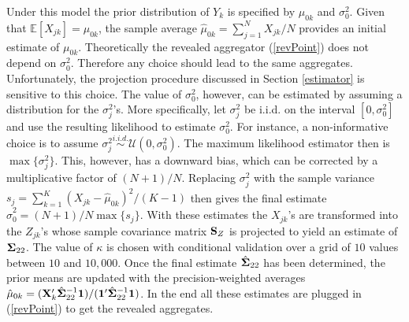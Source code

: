 \documentclass[11pt]{article}
\newcommand{\E}{\mathbb{E}}
\theoremstyle{definition}
\theoremstyle{definition}
\def\one{{\bf 1}}
\def\bSigma{{\bf \Sigma}}
\def\X{{\bf X}}
\def\SS{{\bf S}}
\def\E{{\mathbb E}}
\begin{document}
Under this model the prior distribution of $Y_k$ is specified by $\mu_{0k}$ and $\sigma_0^2$. Given that $\E[X_{jk}] = \mu_{0k}$, the sample average $\hat{\mu}_{0k} = \sum_{j=1}^N X_{jk}/N$ provides an initial estimate of $\mu_{0k}$. Theoretically the revealed aggregator (\ref{revPoint}) does not depend on $\sigma_0^2$. Therefore any choice should lead to the same aggregates. Unfortunately, the projection procedure discussed in Section \ref{estimator} is sensitive to this choice. The value of $\sigma_0^2$, however, can be estimated by assuming a distribution for the $\sigma_j^2$'s. More specifically, let $\sigma_j^2$ be i.i.d. on the interval $[0,\sigma_0^2]$ and use the resulting likelihood to estimate $\sigma_0^2$. For instance, a non-informative choice is to assume $\sigma_j^2 \stackrel{i.i.d.}{\sim} \mathcal{U}(0,\sigma_0^2)$. The maximum likelihood estimator then is $\max\{\sigma_j^2\}$. This, however, has a downward bias, which can be corrected by a multiplicative factor of $(N+1)/N$. Replacing $\sigma_j^2$ with the sample variance  $s_j = \sum_{k=1}^K (X_{jk}-\hat{\mu}_{0k})^2/(K-1)$ then gives the final estimate $\hat{\sigma}_0^2 = (N+1)/N\max\{s_j\}$. With these estimates the $X_{jk}$'s are transformed into the $Z_{jk}$'s whose sample covariance matrix $\SS_Z$ is projected to yield an estimate of $\bSigma_{22}$. The value of $\kappa$ is chosen with conditional validation over a grid of $10$ values between $10$ and $10,000$. Once the final estimate $\hat{\bSigma}_{22}$ has been determined, the prior means are updated with the precision-weighted averages $\hat{\mu}_{0k} = (\X_{k}' \hat{\bSigma}_{22}^{-1} \one)/(\one' \hat{\bSigma}_{22}^{-1} \one)$. In the end all these estimates are plugged in (\ref{revPoint}) to get the revealed aggregates.
\end{document}
